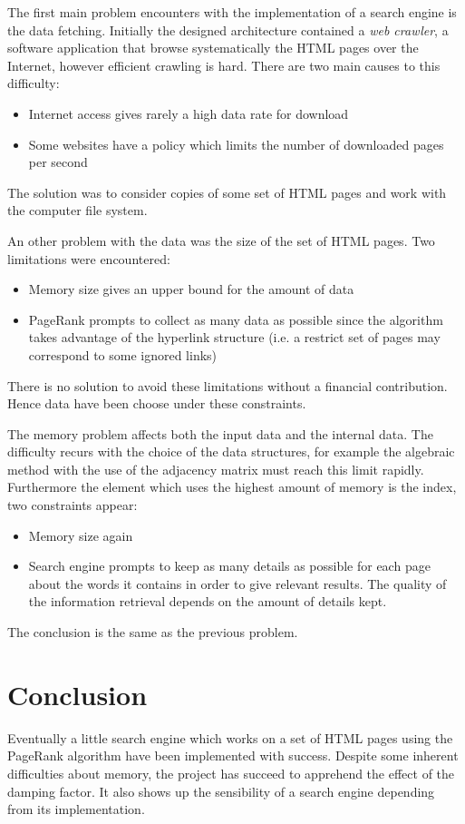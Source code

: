 \documentclass[pdftex,12pt,a4paper]{article}
\begin{document}
The first main problem encounters with the implementation of a search engine is the data fetching. Initially the designed architecture contained a \emph{web crawler}, a software application that browse systematically the HTML pages over the Internet, however efficient crawling is hard.
There are two main causes to this difficulty:
\begin{itemize}
\item Internet access gives rarely a high data rate for download
\item Some websites have a policy which limits the number of downloaded pages per second
\end{itemize}
The solution was to consider copies of some set of HTML pages and work with the computer file system.

An other problem with the data was the size of the set of HTML pages. Two limitations were encountered:
\begin{itemize}
\item Memory size gives an upper bound for the amount of data
\item PageRank prompts to collect as many data as possible since the algorithm takes advantage of the hyperlink structure (i.e. a restrict set of pages may correspond to some ignored links)
\end{itemize}
There is no solution to avoid these limitations without a financial contribution. Hence data have been choose under these constraints.

The memory problem affects both the input data and the internal data. The difficulty recurs with the choice of the data structures, for example the algebraic method with the use of the adjacency matrix must reach this limit rapidly. Furthermore the element which uses the highest amount of memory is the index, two constraints appear:
\begin{itemize}
\item Memory size again
\item Search engine prompts to keep as many details as possible for each page about the words it contains in order to give relevant results. The quality of the information retrieval depends on the amount of details kept.
\end{itemize}
The conclusion is the same as the previous problem.


\section{Conclusion}

Eventually a little search engine which works on a set of HTML pages using the PageRank algorithm have been implemented with success. Despite some inherent difficulties about memory, the project has succeed to apprehend the effect of the damping factor. It also shows up the sensibility of a search engine depending from its implementation.
\end{document}
